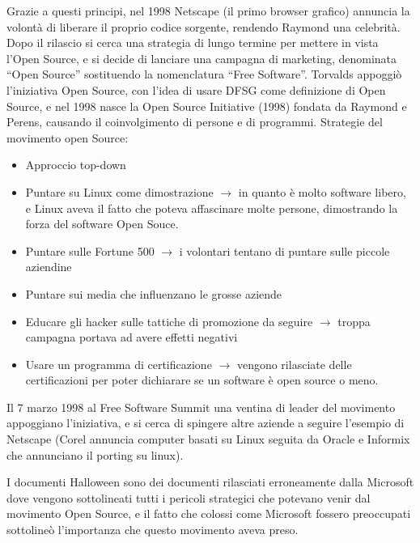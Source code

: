 Grazie a questi principi, nel 1998 Netscape (il primo browser grafico) annuncia la volont\`a di liberare il proprio codice sorgente, rendendo Raymond una celebrit\`a. Dopo il rilascio si cerca una strategia di lungo termine per mettere in vista l'Open Source, e si decide di lanciare una campagna di marketing, denominata ``Open Source'' sostituendo la nomenclatura ``Free Software''. Torvalds appoggi\`o l'iniziativa Open Source, con l'idea di usare DFSG come definizione di Open Source, e nel 1998 nasce la Open Source Initiative (1998) fondata da Raymond e Perens, causando il coinvolgimento di persone e di programmi. Strategie del movimento open Source:
\begin{itemize}

\item Approccio top-down
\item Puntare su Linux come dimostrazione $\to$ in quanto \`e molto software libero, e Linux aveva il fatto che poteva affascinare molte persone, dimostrando la forza del software Open Souce.
\item Puntare sulle Fortune 500 $\to$ i volontari tentano di puntare sulle piccole aziendine
\item Puntare sui media che influenzano le grosse aziende
\item Educare gli hacker sulle tattiche di promozione da seguire $\to$ troppa campagna portava ad avere effetti negativi
\item Usare un programma di certificazione $\to$ vengono rilasciate delle certificazioni per poter dichiarare se un software \`e open source o meno.

\end{itemize}

Il 7 marzo 1998 al Free Software Summit una ventina di leader del movimento appoggiano l'iniziativa, e si cerca di spingere altre aziende a seguire l'esempio di Netscape (Corel annuncia computer basati su Linux seguita da Oracle e Informix che annunciano il porting su linux).

I documenti Halloween sono dei documenti rilasciati erroneamente dalla Microsoft dove vengono sottolineati tutti i pericoli strategici che potevano venir dal movimento Open Source, e il fatto che colossi come Microsoft fossero preoccupati sottoline\`o l'importanza che questo movimento aveva preso.

